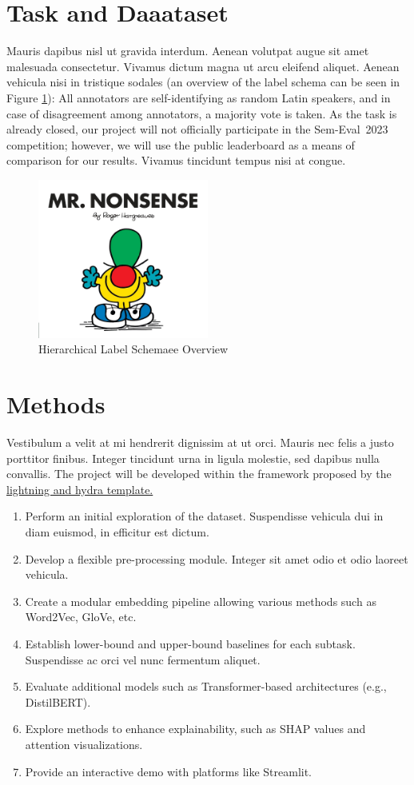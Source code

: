 \documentclass[11pt]{article}
\begin{document}
\section{Task and Daaataset}
Mauris dapibus nisl ut gravida interdum. Aenean volutpat augue sit amet malesuada consectetur. Vivamus dictum magna ut arcu eleifend aliquet. Aenean vehicula nisi in tristique sodales (an overview of the label schema can be seen in Figure \ref{fig:subtasks-overview}):
All annotators are self-identifying as random Latin speakers, and in case of disagreement among annotators, a majority vote is taken. As the task is already closed, our project will not officially participate in the Sem-Eval~2023 competition; however, we will use the public leaderboard as a means of comparison for our results. Vivamus tincidunt tempus nisi at congue. 
\begin{figure}[h]
    \centering
    \includegraphics[width=0.50\textwidth]{figures/nonesense.jpg}
    \caption{Hierarchical Label Schemaee Overview}
    \label{fig:subtasks-overview}
\end{figure}
\section{Methods}
Vestibulum a velit at mi hendrerit dignissim at ut orci. Mauris nec felis a justo porttitor finibus. Integer tincidunt urna in ligula molestie, sed dapibus nulla convallis. The project will be developed within the framework proposed by the \href{https://github.com/ashleve/lightning-hydra-template}{lightning and hydra template.}
\begin{enumerate}
    \item Perform an initial exploration of the dataset. Suspendisse vehicula dui in diam euismod, in efficitur est dictum.
    \item Develop a flexible pre-processing module. Integer sit amet odio et odio laoreet vehicula. 
    \item Create a modular embedding pipeline allowing various methods such as Word2Vec, GloVe, etc.
    \item Establish lower-bound and upper-bound baselines for each subtask. Suspendisse ac orci vel nunc fermentum aliquet.
    \item Evaluate additional models such as Transformer-based architectures (e.g., DistilBERT).
    \item Explore methods to enhance explainability, such as SHAP values and attention visualizations.
    \item Provide an interactive demo with platforms like Streamlit.
\end{enumerate}
\end{document}
